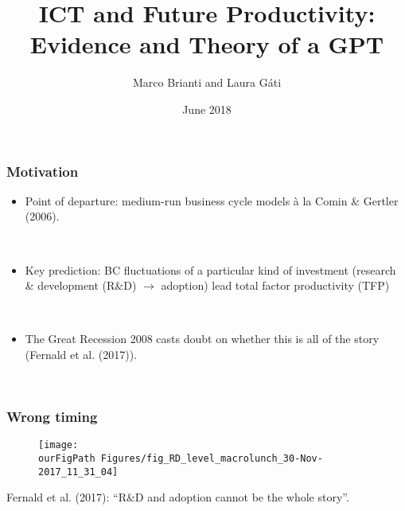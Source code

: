 \documentclass{beamer}
\author[Brianti, G\'ati]{Marco Brianti and Laura G\'ati}
\institute[Boston College]{Boston College}
\title[ICT]{ICT and Future Productivity: Evidence and Theory of a GPT}
\date{June 2018}
\def \ourFigPath {../../}
\begin{document}
\begin{frame}

\maketitle


\end{frame}





\begin{frame}
	\frametitle{Motivation}
	
	\begin{itemize}
		
		\item Point of departure: medium-run business cycle models \`a la Comin \& Gertler (2006).
		
		\
		
		\item Key prediction: BC fluctuations of a particular kind of investment (research \& development (R\&D) $\rightarrow$ adoption) lead total factor productivity (TFP)
		
		\
		
	\item The Great Recession 2008 casts doubt on whether this is all of the story (Fernald et al. (2017)).
	
	\
	
	
	\end{itemize} 

\end{frame}

\begin{frame}
	\frametitle{Wrong timing}
	
		\vspace{-1cm}
	\noindent
	\begin{figure}
		\centering
		\texttt{[image: \\ourFigPath Figures/fig\_RD\_level\_macrolunch\_30-Nov-2017\_11\_31\_04]}
	\end{figure}
	
	Fernald et al. (2017): ``R\&D and adoption cannot be the whole story''.

\end{frame}
\end{document}
